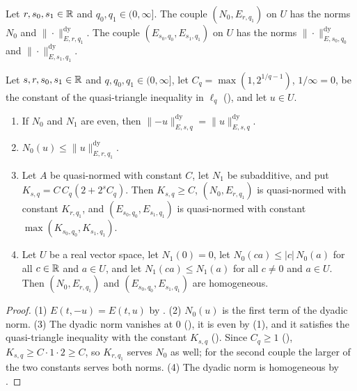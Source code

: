 \begin{definition}
\label{def:e-couples}
\leanok
{}
Let $r, s_0, s_1 \in \mathbb{R}$ and $q_0, q_1 \in (0, \infty]$. The couple $(N_0, E_{r, q_1})$ on $U$
has the norms $N_0$ and $\|\cdot\|^{\mathrm{dy}}_{E, r, q_1}$. The couple
$(E_{s_0, q_0}, E_{s_1, q_1})$ on $U$ has the norms $\|\cdot\|^{\mathrm{dy}}_{E, s_0, q_0}$ and
$\|\cdot\|^{\mathrm{dy}}_{E, s_1, q_1}$.
\end{definition}

\begin{lemma}
\label{lem:e-couples}
\leanok
{}
Let $s, r, s_0, s_1 \in \mathbb{R}$ and $q, q_0, q_1 \in (0, \infty]$, let
$C_q = \max(1, 2^{1/q - 1})$, $1/\infty = 0$, be the constant of the quasi-triangle inequality in
$\ell_q$ (), and let $u \in U$.
\begin{enumerate}
  \item If $N_0$ and $N_1$ are even, then
    $\|{-u}\|^{\mathrm{dy}}_{E, s, q} = \|u\|^{\mathrm{dy}}_{E, s, q}$.
  \item $N_0(u) \leq \|u\|^{\mathrm{dy}}_{E, r, q_1}$.
  \item Let $A$ be quasi-normed with constant $C$, let $N_1$ be subadditive, and put
    $K_{s, q} = C \, C_q (2 + 2^s C_q)$. Then $K_{s, q} \geq C$, $(N_0, E_{r, q_1})$ is
    quasi-normed with constant $K_{r, q_1}$, and $(E_{s_0, q_0}, E_{s_1, q_1})$ is quasi-normed
    with constant $\max(K_{s_0, q_0}, K_{s_1, q_1})$.
  \item Let $U$ be a real vector space, let $N_1(0) = 0$, let $N_0(ca) \leq |c| \, N_0(a)$ for all
    $c \in \mathbb{R}$ and $a \in U$, and let $N_1(ca) \leq N_1(a)$ for all $c \neq 0$ and $a \in U$.
    Then $(N_0, E_{r, q_1})$ and $(E_{s_0, q_0}, E_{s_1, q_1})$ are homogeneous.
\end{enumerate}
\end{lemma}

\begin{proof}
\leanok
{}
(1) $E(t, -u) = E(t, u)$ by . (2) $N_0(u)$ is the first term of the
dyadic norm. (3) The dyadic norm vanishes at $0$ (), it is even by
(1), and it satisfies the quasi-triangle inequality with the constant $K_{s, q}$
(). Since $C_q \geq 1$ (),
$K_{s, q} \geq C \cdot 1 \cdot 2 \geq C$, so $K_{r, q_1}$ serves $N_0$ as well; for the second
couple the larger of the two constants serves both norms. (4) The dyadic norm is homogeneous by
.
\end{proof}


